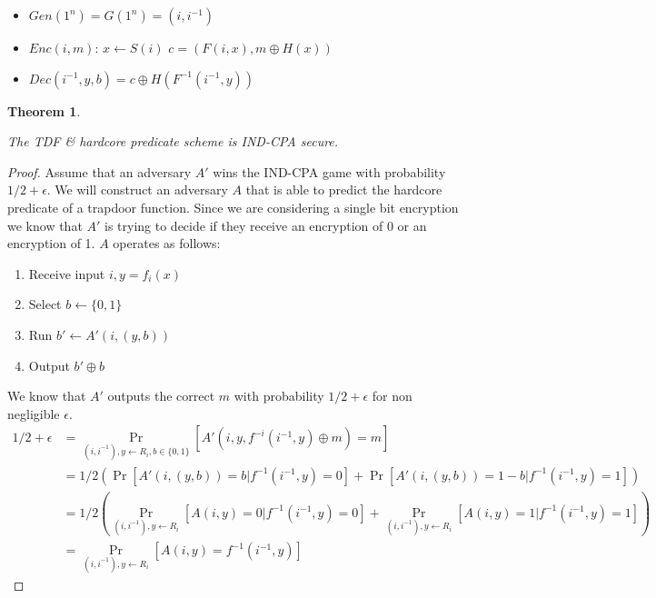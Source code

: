 \documentclass{article}
\newtheorem{thm}{Theorem}[section]
\newenvironment{theorem}{\begin{thm}\begin{rm}}%
{\end{rm}\end{thm}}
\begin{document}
\begin{itemize}
\item $Gen(1^n) = G(1^n) = (i, i^{-1})$
\item $Enc(i, m)$:
\subitem $x\leftarrow S(i)$
\subitem $c = (F(i, x), m\oplus H(x))$
\item $Dec(i^{-1}, y, b) = c \oplus H(F^{-1}(i^{-1}, y))$
\end{itemize}
\begin{theorem}
The TDF \& hardcore predicate scheme is IND-CPA secure.
\end{theorem}
\begin{proof}
Assume that an adversary $A'$ wins the IND-CPA game with probability $1/2 + \epsilon$.  We will construct an adversary $A$ that is able to predict the hardcore predicate of a trapdoor function.  Since we are considering a single bit encryption we know that $A'$ is trying to decide if they receive an encryption of 0 or an encryption of 1. $A$ operates as follows:
\begin{enumerate}
\item Receive input $i, y = f_i(x)$
\item Select $b\leftarrow \{0, 1\}$
\item Run $b' \leftarrow A'(i, (y, b))$
\item Output $b'\oplus b$
\end{enumerate}
We know that $A'$ outputs the correct $m$ with probability $1/2+\epsilon$ for non negligible $\epsilon$.
\begin{align*}
1/2+\epsilon &= \Pr_{(i, i^{-1}), y\leftarrow R_i, b\in\{0,1\}}[A'(i,y, f^{-i}(i^{-1}, y)\oplus m) = m]\\
&=1/2\left(\Pr[A'(i, (y, b))=b| f^{-1}(i^{-1}, y) = 0]+\Pr[A'(i, (y, b))=1-b| f^{-1}(i^{-1}, y) = 1] \right)\\
&=1/2\left(\Pr_{(i, i^{-1}), y\leftarrow R_i}[A(i, y) =0 |  f^{-1}(i^{-1}, y)  = 0] + \Pr_{(i, i^{-1}), y\leftarrow R_i}[A(i, y) =1 | f^{-1}(i^{-1}, y) =1]\right)\\
&= \Pr_{(i, i^{-1}), y\leftarrow R_i}[A(i, y) = f^{-1}(i^{-1}, y) ] 
\end{align*}
\end{proof}


\end{document}
